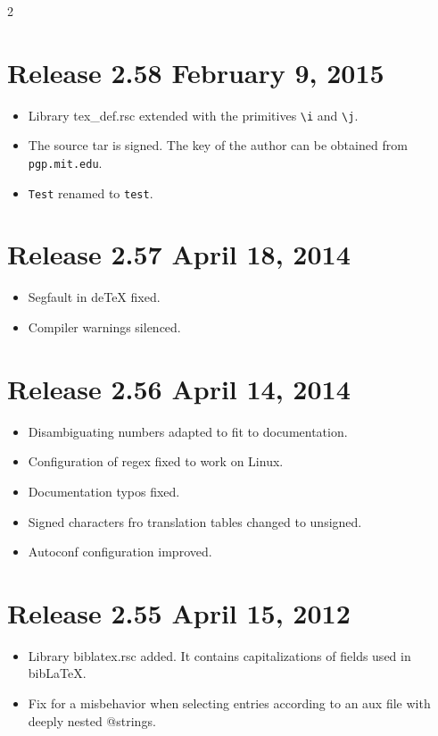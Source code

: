 \documentclass[11pt,a4paper]{scrartcl}
\newcommand\File[1]{\textsf{#1}}
\newenvironment{Releases}{\begin{multicols}2\RaggedRight}{\end{multicols}}
\newenvironment{Release}[2]{%
  \def\tmp{#2}%
  \section*{Release #1 \ifx\tmp\empty\else{\normalsize[#2]}\fi}
  \begin{itemize}
}{\end{itemize}}
\newenvironment{Fix}[1]{\item }{}
\newenvironment{New}[1]{\item }{}
\newenvironment{Update}[1]{\item }{}
\begin{document}
\begin{Releases}
 \begin{Release}{2.58}{February 9, 2015}
  \begin{Update}{gene}
    Library \File{tex\_def.rsc} extended with the primitives \verb|\i| and
    \verb|\j|.
  \end{Update}
  \begin{Update}{gene}
    The source tar is signed. The key of the author can be obtained
    from \texttt{pgp.mit.edu}.
  \end{Update}
  \begin{Update}{gene}
    \texttt{Test} renamed to \texttt{test}.
  \end{Update}
 \end{Release}

 \begin{Release}{2.57}{April 18, 2014}
  \begin{Fix}{gene}
    Segfault in deTeX fixed.
  \end{Fix}
  \begin{Fix}{gene}
    Compiler warnings silenced.
  \end{Fix}
 \end{Release}

 \begin{Release}{2.56}{April 14, 2014}
  \begin{Fix}{gene}
    Disambiguating numbers adapted to fit to documentation.
  \end{Fix}
  \begin{Fix}{gene}
    Configuration of regex fixed to work on Linux.
  \end{Fix}
  \begin{Fix}{gene}
    Documentation typos fixed.
  \end{Fix}
  \begin{Fix}{gene}
    Signed characters fro translation tables changed to unsigned.
  \end{Fix}
  \begin{Fix}{gene}
    Autoconf configuration improved.
  \end{Fix}
 \end{Release}

 \begin{Release}{2.55}{April 15, 2012}
  \begin{New}{gene}
    Library \File{biblatex.rsc} added. It contains capitalizations of
    fields used in bib\LaTeX.
  \end{New}
  \begin{Fix}{gene}
    Fix for a misbehavior when selecting entries according to an aux file
    with deeply nested @strings.
  \end{Fix}
 \end{Release}


\end{Releases}
\end{document}
